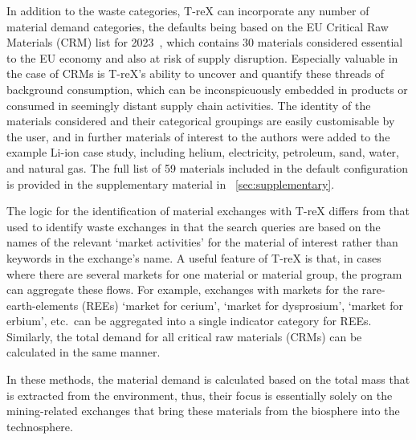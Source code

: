 In addition to the waste categories, T-reX can incorporate any number of material demand categories, the defaults being based on the EU Critical Raw Materials (CRM) list for 2023~\citep{eu2023crmstudy}, which contains 30 materials considered essential to the EU economy and also at risk of supply disruption. Especially valuable in the case of CRMs is T-reX's ability to uncover and quantify these threads of background consumption, which can be inconspicuously embedded in products or consumed in seemingly distant supply chain activities. The identity of the materials considered and their categorical groupings are easily customisable by the user, and in further materials of interest to the authors were added to the example Li-ion case study, including helium, electricity, petroleum, sand, water, and natural gas. The full list of 59 materials included in the default configuration is provided in the supplementary material in ~\autoref{sec:supplementary}.

The logic for the identification of material exchanges with T-reX differs from that used to identify waste exchanges in that the search queries are based on the names of the relevant `market activities' for the material of interest rather than keywords in the exchange's name. A useful feature of T-reX is that, in cases where there are several markets for one material or material group, the program can aggregate these flows. For example, exchanges with markets for the rare-earth-elements (REEs) `market for cerium', `market for dysprosium', `market for erbium', etc.\ can be aggregated into a single indicator category for REEs. Similarly, the total demand for all critical raw materials (CRMs) can be calculated in the same manner.


In these methods, the material demand is calculated based on the total mass that is extracted from the environment, thus, their focus is essentially solely on the mining-related exchanges that bring these materials from the biosphere into the technosphere.

